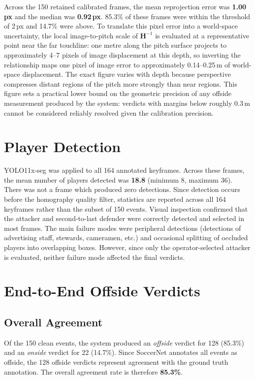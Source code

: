 Across the 150 retained calibrated frames, the mean reprojection error was \textbf{1.00\,px} and the median was \textbf{0.92\,px}. 85.3\% of these frames were within the threshold of 2\,px and 14.7\% were above. To translate this pixel error into a world-space uncertainty, the local image-to-pitch scale of $\mathbf{H}^{-1}$ is evaluated at a representative point near the far touchline: one metre along the pitch surface projects to approximately 4--7 pixels of image displacement at this depth, so inverting the relationship maps one pixel of image error to approximately 0.14--0.25\,m of world-space displacement. The exact figure varies with depth because perspective compresses distant regions of the pitch more strongly than near regions. This figure sets a practical lower bound on the geometric precision of any offside measurement produced by the system: verdicts with margins below roughly 0.3\,m cannot be considered reliably resolved given the calibration precision.

\section{Player Detection}%
\label{sec:eval_detection}

YOLO11x-seg was applied to all 164 annotated keyframes. Across these frames, the mean number of players detected was \textbf{18.8} (minimum 8, maximum 36). There was not a frame which produced zero detections. Since detection occurs before the homography quality filter, statistics are reported across all 164 keyframes rather than the subset of 150 events. Visual inspection confirmed that the attacker and second-to-last defender were correctly detected and selected in most frames. The main failure modes were peripheral detections (detections of advertising staff, stewards, cameramen, etc.) and occasional splitting of occluded players into overlapping boxes. However, since only the operator-selected attacker is evaluated, neither failure mode affected the final verdicts.

\section{End-to-End Offside Verdicts}%
\label{sec:eval_offside}

\subsection{Overall Agreement}

Of the 150 clean events, the system produced an \emph{offside} verdict for 128 (85.3\%) and an \emph{onside} verdict for 22 (14.7\%). Since SoccerNet annotates all events as offside, the 128 offside verdicts represent agreement with the ground truth annotation. The overall agreement rate is therefore \textbf{85.3\%}.

